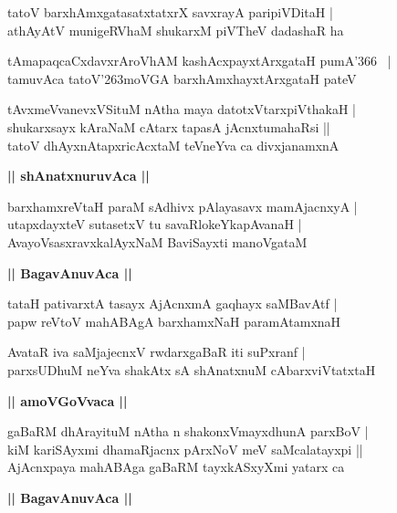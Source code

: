 \documentclass[twoside,12pt,openright]{book}
\def\S{\char'263}
\newcounter{shloka}[chapter]
\def\uvaca#1{\centerline{{\large\textbf{#1}}}}
\begin{document}
\begin{shloka}%
tatoV barxhAmxgatasatxtatxrX savxrayA paripiVDitaH |\\
athAyAtV munigeRVhaM shukarxM piVTheV dadashaR ha 
\end{shloka}

\begin{shloka}%
tAmapaqcaCxdavxrAroVhAM kashAcxpayxtArxgataH pumA\char'366 ~|\\
tamuvAca tatoV\S moVGA barxhAmxhayxtArxgataH pateV 
\end{shloka}

\begin{shloka}%
tAvxmeVvanevxVSituM nAtha maya datotxVtarxpiVthakaH |\\
shukarxsayx kAraNaM cAtarx tapasA jAcnxtumahaRsi ||\\
tatoV dhAyxnAtapxricAcxtaM teVneYva ca divxjanamxnA
\end{shloka}

\uvaca{|| shAnatxnuruvAca ||}

\begin{shloka}%
barxhamxreVtaH paraM sAdhivx pAlayasavx mamAjacnxyA |\\
utapxdayxteV sutasetxV tu savaRlokeYkapAvanaH |\\
AvayoVsasxravxkalAyxNaM BaviSayxti manoVgataM 
\end{shloka}

\uvaca{|| BagavAnuvAca ||}

\begin{shloka}%
tataH pativarxtA tasayx AjAcnxmA gaqhayx saMBavAtf |\\
papw reVtoV mahABAgA barxhamxNaH paramAtamxnaH 
\end{shloka}

\begin{shloka}%
AvataR iva saMjajecnxV rwdarxgaBaR iti suPxranf |\\
parxsUDhuM neYva shakAtx sA shAnatxnuM cAbarxviVtatxtaH 
\end{shloka}

\uvaca{|| amoVGoVvaca ||}

\begin{shloka}%
gaBaRM dhArayituM nAtha n shakonxVmayxdhunA parxBoV |\\
kiM kariSAyxmi dhamaRjacnx pArxNoV meV saMcalatayxpi ||\\
AjAcnxpaya mahABAga gaBaRM tayxkASxyXmi yatarx ca 
\end{shloka}

\uvaca{|| BagavAnuvAca ||}
\end{document}
